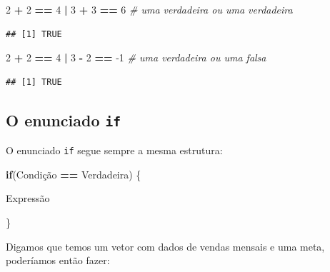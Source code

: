 \documentclass[
]{article}
\newenvironment{Shaded}{\begin{snugshade}}{\end{snugshade}}
\newcommand{\CommentTok}[1]{\textcolor[rgb]{0.56,0.35,0.01}{\textit{#1}}}
\newcommand{\ControlFlowTok}[1]{\textcolor[rgb]{0.13,0.29,0.53}{\textbf{#1}}}
\newcommand{\DecValTok}[1]{\textcolor[rgb]{0.00,0.00,0.81}{#1}}
\newcommand{\NormalTok}[1]{#1}
\newcommand{\OperatorTok}[1]{\textcolor[rgb]{0.81,0.36,0.00}{\textbf{#1}}}
\newcommand{\StringTok}[1]{\textcolor[rgb]{0.31,0.60,0.02}{#1}}
\begin{document}
\begin{Shaded}
\begin{Highlighting}[]
\DecValTok{2} \OperatorTok{+}\StringTok{ }\DecValTok{2} \OperatorTok{==}\StringTok{ }\DecValTok{4} \OperatorTok{|}\StringTok{ }\DecValTok{3} \OperatorTok{+}\StringTok{ }\DecValTok{3} \OperatorTok{==}\StringTok{ }\DecValTok{6} \CommentTok{# uma verdadeira ou uma verdadeira}
\end{Highlighting}
\end{Shaded}

\begin{verbatim}
## [1] TRUE
\end{verbatim}

\begin{Shaded}
\begin{Highlighting}[]
\DecValTok{2} \OperatorTok{+}\StringTok{ }\DecValTok{2} \OperatorTok{==}\StringTok{ }\DecValTok{4} \OperatorTok{|}\StringTok{ }\DecValTok{3} \OperatorTok{-}\StringTok{ }\DecValTok{2} \OperatorTok{==}\StringTok{ }\DecValTok{-1} \CommentTok{# uma verdadeira ou uma falsa}
\end{Highlighting}
\end{Shaded}

\begin{verbatim}
## [1] TRUE
\end{verbatim}

\hypertarget{o-enunciado-if}{%
\subsection{\texorpdfstring{O enunciado
\texttt{if}}{O enunciado if}}\label{o-enunciado-if}}

O enunciado \texttt{if} segue sempre a mesma estrutura:

\begin{Shaded}
\begin{Highlighting}[]
\ControlFlowTok{if}\NormalTok{(Condição }\OperatorTok{==}\StringTok{ }\NormalTok{Verdadeira) \{}
  
\NormalTok{  Expressão}
  
\NormalTok{  \}}
\end{Highlighting}
\end{Shaded}

Digamos que temos um vetor com dados de vendas mensais e uma meta,
poderíamos então fazer:
\end{document}
